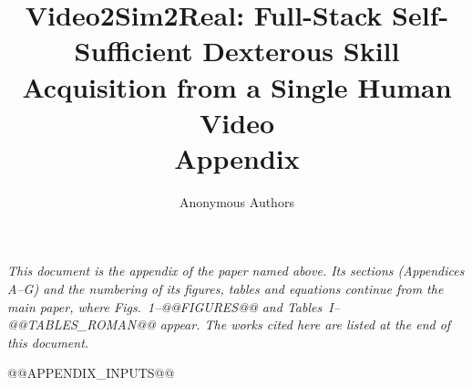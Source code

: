 \documentclass[letterpaper, 10pt, conference]{ieeeconf}
\title{\LARGE \bf
Video2Sim2Real: Full-Stack Self-Sufficient Dexterous Skill Acquisition from a Single Human Video\\[0.6em]
\Large Appendix
}
\author{Anonymous Authors}   %
\begin{document}
\maketitle
\thispagestyle{plain}
\pagestyle{plain}

\noindent\textit{This document is the appendix of the paper named above. Its sections
(Appendices A--G) and the numbering of its figures, tables and equations continue from the
main paper, where Figs.~1--@@FIGURES@@ and Tables~I--@@TABLES_ROMAN@@ appear. The works
cited here are listed at the end of this document.}

\setcounter{figure}{@@FIGURES@@}
\setcounter{table}{@@TABLES@@}
\setcounter{equation}{@@EQUATIONS@@}

\useRomanappendicesfalse
\appendices
@@APPENDIX_INPUTS@@



\end{document}

